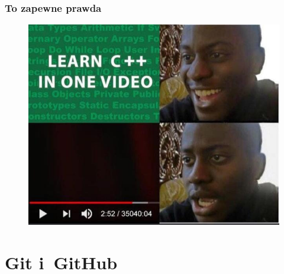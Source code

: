 \documentclass[10pt,t]{beamer}
\begin{document}
\begin{frame}
  \frametitle{To zapewne prawda}


  \begin{figure}

    \centering


    \includegraphics[scale=0.4]
    {./PresentationsPictures/Learning-Cpp.jpg}

  \end{figure}

\end{frame}










\section{Git i~GitHub}
\end{document}
